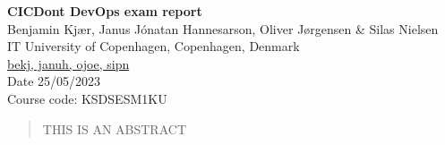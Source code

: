 \newcommand{\titleOfPaper}{CICDont DevOps exam report}
\newcommand{\authorOfPaper}{Benjamin Kjær, Janus Jónatan Hannesarson, Oliver Jørgensen \& Silas Nielsen }
\newcommand{\authoremail}{bekj, januh, ojoe, sipn}
\newcommand{\coursecode}{KSDSESM1KU}
\newcommand{\handInDate}{25/05/2023}

\begin{center}
    \textbf{\huge \titleOfPaper} \\ \vspace{1em}
    \authorOfPaper \\ \vspace{1em}
    IT University of Copenhagen, Copenhagen, Denmark \\
    \href{mailto:\authoremail}{\authoremail} \\ \vspace{1em}
    Date \handInDate \\ \vspace{1em}
    Course code: \coursecode
\end{center} 

\begin{abstract}
    THIS IS AN ABSTRACT
\end{abstract}